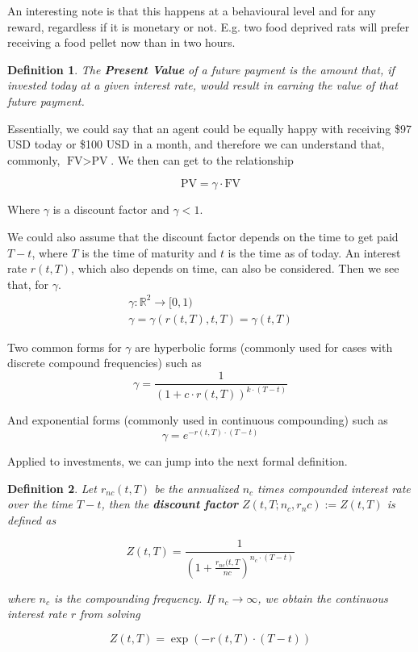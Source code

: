 \documentclass[10pt,letterpaper]{article}
\newtheorem{definition}{Definition}
\begin{document}
An interesting note is that this happens at a behavioural level and for any reward, regardless if it is monetary or not. E.g. two food deprived rats will prefer receiving a food pellet now than in two hours.

\begin{definition}
The \emph{\textbf{Present Value}} of a future payment is the amount that, if invested today at a given interest rate, would result in earning the value of that future payment.
\end{definition}

Essentially, we could say that an agent could be equally happy with receiving \$97 USD today or \$100 USD in a month, and therefore we can understand that, commonly, $\mbox{FV} > \mbox{PV}$. We then can get to the relationship

$$\mbox{PV} = \gamma\cdot \mbox{FV}$$

Where $\gamma$ is a discount factor and $\gamma < 1$.

We could also assume that the discount factor depends on the time to get paid $T - t$, where $T$ is the time of maturity and $t$ is the time as of today. An interest rate $r(t, T)$, which also depends on time, can also be considered. Then we see that, for $\gamma$.
\begin{eqnarray}
\gamma : \mathbb{R}^2 \rightarrow [0, 1) \\
\gamma = \gamma(r(t, T), t, T) = \gamma(t, T)
\end{eqnarray}

Two common forms for $\gamma$ are hyperbolic forms (commonly used for cases with discrete compound frequencies) such as
$$
\gamma = \frac{1}{(1+c\cdot r(t, T))^{k\cdot(T-t)}}
$$

And exponential forms (commonly used in continuous compounding) such as
$$
\gamma = e^{-r(t,T)\cdot(T-t)}
$$

Applied to investments, we can jump into the next formal definition.

\begin{definition}
Let $r_{nc}(t, T)$ be the annualized $n_c$ times compounded interest rate over the time $T - t$, then the \emph{\textbf{discount factor}} $Z(t,T; n_c,r_nc) := Z (t, T)$ is defined as

\begin{equation}\label{hypdct}
Z(t, T) = \frac{1}{\left( 1 + \frac{r_{nc}(t, T}{nc}\right)^{n_c \cdot (T-t)}}
\end{equation}

where $n_c$ is the compounding frequency. If $n_c \to \infty$, we obtain the continuous interest rate $r$ from solving

\begin{equation}\label{expdct}
Z(t, T) = \exp\left(-r(t, T) \cdot (T - t)\right)
\end{equation}
\end{definition}
\end{document}
